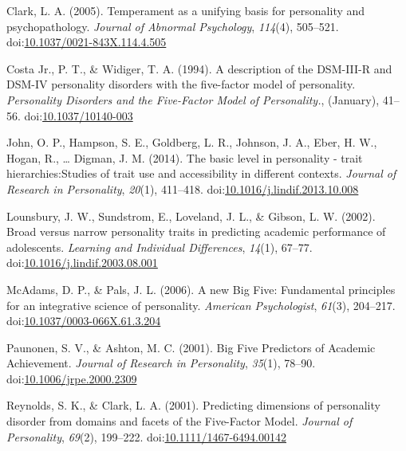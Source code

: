 \documentclass[,man]{apa6}
\theoremstyle{definition}
\theoremstyle{definition}
\theoremstyle{definition}
\theoremstyle{remark}
\begin{document}
\begingroup
\setlength{\parindent}{-0.5in}
\setlength{\leftskip}{0.5in}

\hypertarget{refs}{}
\leavevmode\hypertarget{ref-Clark2005}{}%
Clark, L. A. (2005). Temperament as a unifying basis for personality and
psychopathology. \emph{Journal of Abnormal Psychology}, \emph{114}(4),
505--521.
doi:\href{https://doi.org/10.1037/0021-843X.114.4.505}{10.1037/0021-843X.114.4.505}

\leavevmode\hypertarget{ref-Widiger1994}{}%
Costa Jr., P. T., \& Widiger, T. A. (1994). A description of the
DSM-III-R and DSM-IV personality disorders with the five-factor model of
personality. \emph{Personality Disorders and the Five-Factor Model of
Personality.}, (January), 41--56.
doi:\href{https://doi.org/10.1037/10140-003}{10.1037/10140-003}

\leavevmode\hypertarget{ref-Ziegler2014}{}%
John, O. P., Hampson, S. E., Goldberg, L. R., Johnson, J. A., Eber, H.
W., Hogan, R., \ldots{} Digman, J. M. (2014). The basic level in
personality - trait hierarchies:Studies of trait use and accessibility
in different contexts. \emph{Journal of Research in Personality},
\emph{20}(1), 411--418.
doi:\href{https://doi.org/10.1016/j.lindif.2013.10.008}{10.1016/j.lindif.2013.10.008}

\leavevmode\hypertarget{ref-Lounsbury2002}{}%
Lounsbury, J. W., Sundstrom, E., Loveland, J. L., \& Gibson, L. W.
(2002). Broad versus narrow personality traits in predicting academic
performance of adolescents. \emph{Learning and Individual Differences},
\emph{14}(1), 67--77.
doi:\href{https://doi.org/10.1016/j.lindif.2003.08.001}{10.1016/j.lindif.2003.08.001}

\leavevmode\hypertarget{ref-McAdams2006a}{}%
McAdams, D. P., \& Pals, J. L. (2006). A new Big Five: Fundamental
principles for an integrative science of personality. \emph{American
Psychologist}, \emph{61}(3), 204--217.
doi:\href{https://doi.org/10.1037/0003-066X.61.3.204}{10.1037/0003-066X.61.3.204}

\leavevmode\hypertarget{ref-Paunonen2001}{}%
Paunonen, S. V., \& Ashton, M. C. (2001). Big Five Predictors of
Academic Achievement. \emph{Journal of Research in Personality},
\emph{35}(1), 78--90.
doi:\href{https://doi.org/10.1006/jrpe.2000.2309}{10.1006/jrpe.2000.2309}

\leavevmode\hypertarget{ref-ClarkReynolds2001}{}%
Reynolds, S. K., \& Clark, L. A. (2001). Predicting dimensions of
personality disorder from domains and facets of the Five-Factor Model.
\emph{Journal of Personality}, \emph{69}(2), 199--222.
doi:\href{https://doi.org/10.1111/1467-6494.00142}{10.1111/1467-6494.00142}
\end{document}

